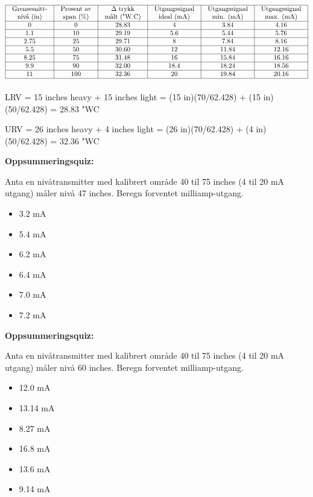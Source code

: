 $$\vbox{\offinterlineskip
\halign{\strut
\vrule \quad\hfil # \ \hfil &
\vrule \quad\hfil # \ \hfil &
\vrule \quad\hfil # \ \hfil &
\vrule \quad\hfil # \ \hfil &
\vrule \quad\hfil # \ \hfil &
\vrule \quad\hfil # \ \hfil \vrule \cr
\noalign{\hrule}
%
Grensesnitt- & Prosent av & $\Delta$ trykk & Utgangssignal & Utgangssignal & Utgangssignal \cr
%
nivå (in) & span (\%) & målt ("W.C) & ideal (mA) & min. (mA) & max. (mA) \cr
%
\noalign{\hrule}
%
0 & 0 & 28.83 & 4 & 3.84 & 4.16 \cr
%
\noalign{\hrule}
%
1.1 & 10 & 29.19 & 5.6 & 5.44 & 5.76 \cr
%
\noalign{\hrule}
%
2.75 & 25 & 29.71 & 8 & 7.84 & 8.16 \cr
%
\noalign{\hrule}
%
5.5 & 50 & 30.60 & 12 & 11.84 & 12.16 \cr
%
\noalign{\hrule}
%
8.25 & 75 & 31.48 & 16 & 15.84 & 16.16 \cr
%
\noalign{\hrule}
%
9.9 & 90 & 32.00 & 18.4 & 18.24 & 18.56 \cr
%
\noalign{\hrule}
%
11 & 100 & 32.36 & 20 & 19.84 & 20.16 \cr
%
\noalign{\hrule}
} %
}$$ %







LRV = 15 inches heavy + 15 inches light = (15 in)(70/62.428) + (15 in)(50/62.428) = 28.83 "WC

\vskip 10pt

URV = 26 inches heavy + 4 inches light = (26 in)(70/62.428) + (4 in)(50/62.428) = 32.36 "WC

\vfil \eject

\noindent
{\bf Oppsummeringsquiz:}

Anta en nivåtransmitter med kalibrert område 40 til 75 inches (4 til 20 mA utgang) måler nivå 47 inches. Beregn forventet milliamp-utgang.

\begin{itemize}
\item{} 3.2 mA
\vskip 5pt
\item{} 5.4 mA
\vskip 5pt
\item{} 6.2 mA
\vskip 5pt
\item{} 6.4 mA
\vskip 5pt
\item{} 7.0 mA
\vskip 5pt
\item{} 7.2 mA
\end{itemize}

\vfil \eject

\noindent
{\bf Oppsummeringsquiz:}

Anta en nivåtransmitter med kalibrert område 40 til 75 inches (4 til 20 mA utgang) måler nivå 60 inches. Beregn forventet milliamp-utgang.

\begin{itemize}
\item{} 12.0 mA
\vskip 5pt
\item{} 13.14 mA
\vskip 5pt
\item{} 8.27 mA
\vskip 5pt
\item{} 16.8 mA
\vskip 5pt
\item{} 13.6 mA
\vskip 5pt
\item{} 9.14 mA
\end{itemize}


